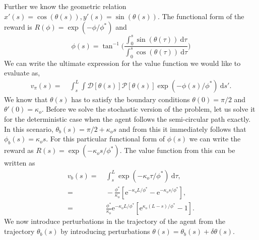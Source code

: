\documentclass[12pt]{article}
\def\d{\text{d}}
\def\e{\text{e}}
\def\P{\mathcal{P}}
\def\D{\mathcal{D}}
\begin{document}
Further we know the geometric relation $x'(s) = \cos(\theta(s)), y'(s) = \sin(\theta(s))$. The functional
form of the reward is $R(\phi) = \exp(-\phi/\phi^*)$ and 
\[
    \phi(s) = \tan^{-1}\bigg( \frac{\int_0^s \sin(\theta(\tau)) \ \d \tau}{\int_0^s \cos(\theta(\tau)) \ \d \tau} \bigg)
\]
We can write the ultimate expression for the value function we would like to evaluate as,
\begin{align}
    v_\pi(s) =& \ \int_{s}^L \int \D[\theta(s)] \P[\theta(s)] \exp(-\phi(s)/\phi^*) \ \d s'.
\end{align}
We know that $\theta(s)$ has to satisfy the boundary conditions $\theta(0) = \pi/2$ and $\theta'(0) = \kappa_o$.
Before we solve the stochastic version of the problem, let us solve it for the deterministic case when
the agent follows the semi-circular path exactly. In this scenario, $\theta_b(s) = \pi/2 + \kappa_o s$ and
from this it immediately follows that $\phi_b(s) = \kappa_o s$. For this particular functional form of $\phi(s)$
we can write the reward as $R(s) = \exp(-\kappa_o s/\phi^*)$. The value function from this can be written as
\begin{align}
    v_b(s) =& \ \int_s^L \exp(-\kappa_o \tau/\phi^*) \ \d \tau, \\
    =& \ -\frac{\phi^*}{\kappa_o} [\e^{-\kappa_o L/\phi^*} - \e^{-\kappa_o s/\phi^*}], \\
    =& \ \frac{\phi^*}{\kappa_o} \e^{-\kappa_o L/\phi^*} [ \e^{\kappa_o(L-s)/\phi^*} - 1].
\end{align}
We now introduce perturbations in the trajectory of the agent from the trajectory $\theta_b(s)$ by introducing
perturbations $\theta(s) = \theta_b(s) + \delta \theta(s)$.

\end{document}
